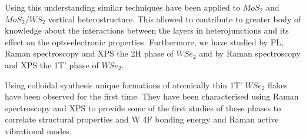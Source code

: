 Using this understanding similar techniques have been applied to $MoS_2$ and $MoS_2/WS_2$ vertical heterostructure. This allowed to contribute to greater body of knowledge about the interactions between the layers in heterojunctions and its effect on the opto-electronic properties. Furthermore, we have studied by PL, Raman spectroscopy and XPS the 2H phase of $WSe_2$ and by Raman spectroscopy and XPS the 1T’ phase of $WSe_2$.

Using colloidal synthesis unique formations of atomically thin 1T' $WSe_2$ flakes have been observed for the first time. They have been characterised using Raman spectroscopy and XPS to provide some of the first studies of those phases to correlate structural properties and W 4F bonding energy and Raman active vibrational modes.